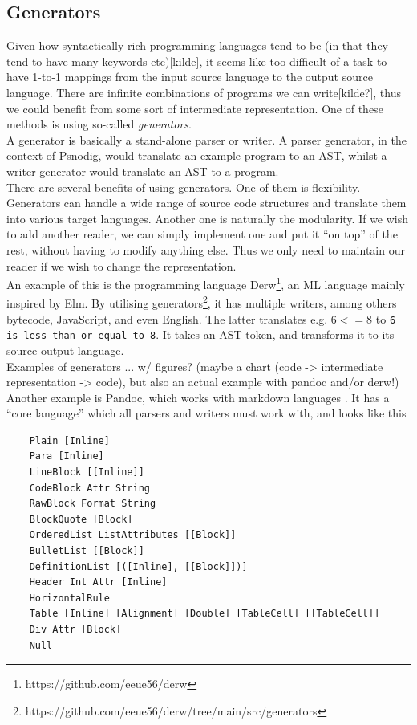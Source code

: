 \subsection{Generators}

Given how syntactically rich programming languages tend to be (in that they tend to have many keywords etc)[kilde], it seems like too difficult of a task to have 1-to-1 mappings from the input source language to the output source language. There are infinite combinations of programs we can write[kilde?], thus we could benefit from some sort of intermediate representation. One of these methods is using so-called \textit{generators}. \hfill \\

A generator is basically a stand-alone parser or writer. A parser generator, in the context of Psnodig, would translate an example program to an AST, whilst a writer generator would translate an AST to a program. \hfill \\

There are several benefits of using generators. One of them is flexibility. Generators can handle a wide range of source code structures and translate them into various target languages. Another one is naturally the modularity. If we wish to add another reader, we can simply implement one and put it ``on top'' of the rest, without having to modify anything else. Thus we only need to maintain our reader if we wish to change the representation. \hfill \\

An example of this is the programming language Derw\footnote{https://github.com/eeue56/derw}, an ML language mainly inspired by Elm. By utilising generators\footnote{https://github.com/eeue56/derw/tree/main/src/generators}, it has multiple writers, among others bytecode, JavaScript, and even English. The latter translates e.g. $6 <= 8$ to \texttt{6 is less than or equal to 8}. It takes an AST token, and transforms it to its source output language. \hfill \\

Examples of generators ... w/ figures? (maybe a chart (code -> intermediate representation -> code), but also an actual example with pandoc and/or derw!) \\

Another example is Pandoc, which works with markdown languages \cite{dominici2014}. It has a ``core language'' which all parsers and writers must work with, and looks like this 

\begin{verbatim}
    Plain [Inline]
    Para [Inline]
    LineBlock [[Inline]]
    CodeBlock Attr String
    RawBlock Format String
    BlockQuote [Block]
    OrderedList ListAttributes [[Block]]
    BulletList [[Block]]
    DefinitionList [([Inline], [[Block]])]
    Header Int Attr [Inline]
    HorizontalRule
    Table [Inline] [Alignment] [Double] [TableCell] [[TableCell]]
    Div Attr [Block]
    Null
\end{verbatim}

